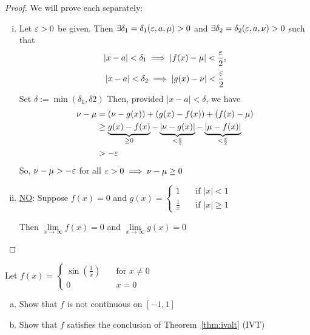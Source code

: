 \begin{proof}
    We will prove each separately:
    \begin{enumerate}[(i)]
    \item Let $\varepsilon > 0$ be given. Then $\exists \delta_1 = \delta_1(\varepsilon, a, \mu) > 0$ and 
        $\exists \delta_2 = \delta_2(\varepsilon, a, \nu) > 0$ such that 
        $$ |x-a| < \delta_1 \implies |f(x) - \mu| < \frac{\varepsilon}{2},$$ 
        $$ |x-a| < \delta_2 \implies |g(x) - \nu| < \frac{\varepsilon}{2}$$
        Set $\delta := \min(\delta_1, \delta 2)$
        Then, provided $|x-a| < \delta$, we have 
        \begin{align*}
            \nu - \mu &= (\nu - g(x)) + (g(x) - f(x)) + (f(x) - \mu) \\
            &\geq \underbrace{g(x) - f(x)}_{\geq 0} - \underbrace{|\nu - g(x)|}_{<\frac{\varepsilon}{2}} - \underbrace{|\mu - f(x)|}_{<\frac{\varepsilon}{2}} \\
            &> -\varepsilon
        \end{align*}
        So, $\nu - \mu > -\varepsilon$ for all $\varepsilon > 0 \implies \nu - \mu \geq 0$
    \item \underline{NO}: Suppose $f(x) = 0$ and $g(x) = \begin{cases}
        1       & \quad \text{if } |x| < 1\\
        \frac{1}{x}& \quad \text{if } |x| \geq 1
        \end{cases}$

        Then $\lim\limits_{x\to \infty} f(x) = 0$ and $\lim\limits_{x\to \infty} g(x) = 0$
    \end{enumerate}
\end{proof}

\begin{example}
    Let $f(x) = \begin{cases}
        \sin\left(\frac{1}{x}\right)       & \quad \text{for } x \neq 0\\
        0 & \quad x = 0
        \end{cases}$
    \begin{enumerate}[(a)]
        \item Show that $f$ is not continuous on $\left[-1, 1\right]$
        \item Show that $f$ satisfies the conclusion of Theorem~\ref{thm:ivalt} (IVT)
    \end{enumerate}
\end{example}

